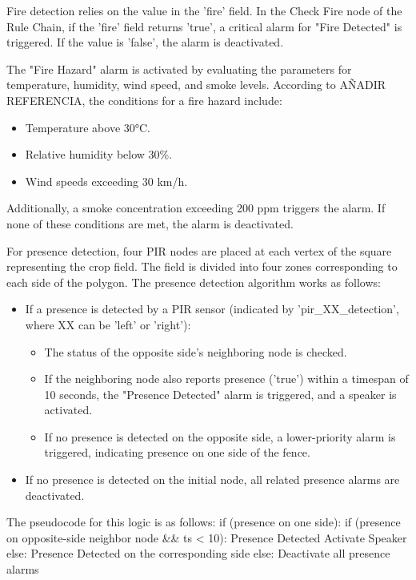 Fire detection relies on the value in the 'fire' field. In the Check Fire node of the Rule Chain, if the 'fire' field returns 'true', a critical alarm for "Fire Detected"
is triggered. If the value is 'false', the alarm is deactivated.

The "Fire Hazard" alarm is activated by evaluating the parameters for temperature, humidity, wind speed, and smoke levels. According to AÑADIR REFERENCIA, the conditions 
for a fire hazard include:
\begin{itemize}
    \item Temperature above 30°C.
    \item Relative humidity below 30\%.
    \item Wind speeds exceeding 30 km/h.
\end{itemize}

Additionally, a smoke concentration exceeding 200 ppm triggers the alarm. If none of these conditions are met, the alarm is deactivated.

For presence detection, four PIR nodes are placed at each vertex of the square representing the crop field. The field is divided into four zones corresponding to each side 
of the polygon. The presence detection algorithm works as follows:
\begin{itemize}
    \item If a presence is detected by a PIR sensor (indicated by 'pir_XX_detection', where XX can be 'left' or 'right'):
    \begin{itemize}
        \item The status of the opposite side’s neighboring node is checked.
        \item If the neighboring node also reports presence ('true') within a timespan of 10 seconds, the "Presence Detected" alarm is triggered, and a speaker is activated.
        \item If no presence is detected on the opposite side, a lower-priority alarm is triggered, indicating presence on one side of the fence.
    \end{itemize}
    \item If no presence is detected on the initial node, all related presence alarms are deactivated. 
\end{itemize}

The pseudocode for this logic is as follows:
if (presence on one side):
    if (presence on opposite-side neighbor node && ts < 10):
        Presence Detected
        Activate Speaker
    else:
        Presence Detected on the corresponding side
else:
    Deactivate all presence alarms

